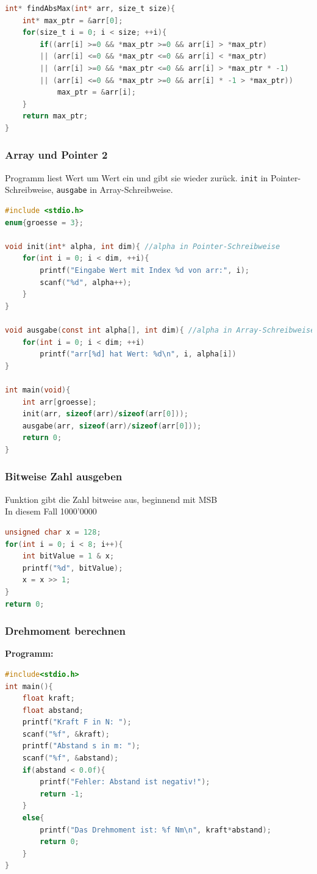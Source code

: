			\begin{lstlisting}[language=C]
int* findAbsMax(int* arr, size_t size){
	int* max_ptr = &arr[0];
	for(size_t i = 0; i < size; ++i){
		if((arr[i] >=0 && *max_ptr >=0 && arr[i] > *max_ptr)
		|| (arr[i] <=0 && *max_ptr <=0 && arr[i] < *max_ptr)
		|| (arr[i] >=0 && *max_ptr <=0 && arr[i] > *max_ptr * -1)
		|| (arr[i] <=0 && *max_ptr >=0 && arr[i] * -1 > *max_ptr))
			max_ptr = &arr[i];
	}
	return max_ptr;
}
			\end{lstlisting}
		
		\subsubsection{Array und Pointer 2}
			Programm liest Wert um Wert ein und gibt sie wieder zurück. \verb|init| in Pointer-Schreibweise, \verb|ausgabe| in Array-Schreibweise.
			\begin{lstlisting}[language=C]
#include <stdio.h>
enum{groesse = 3};

void init(int* alpha, int dim){ //alpha in Pointer-Schreibweise
	for(int i = 0; i < dim, ++i){
		printf("Eingabe Wert mit Index %d von arr:", i);
		scanf("%d", alpha++);
	}
}

void ausgabe(const int alpha[], int dim){ //alpha in Array-Schreibweise
	for(int i = 0; i < dim; ++i)
		printf("arr[%d] hat Wert: %d\n", i, alpha[i])
}

int main(void){
	int arr[groesse];
	init(arr, sizeof(arr)/sizeof(arr[0]));
	ausgabe(arr, sizeof(arr)/sizeof(arr[0]));
	return 0;
}
			\end{lstlisting}

		\subsubsection{Bitweise Zahl ausgeben}
			Funktion gibt die Zahl bitweise aus, beginnend mit MSB\\
			In diesem Fall 1000'0000
			\begin{lstlisting}[language=C]
unsigned char x = 128;
for(int i = 0; i < 8; i++){
	int bitValue = 1 & x;
	printf("%d", bitValue);
	x = x >> 1;
}
return 0;
			\end{lstlisting}

		\subsubsection{Drehmoment berechnen}
			\textbf{Programm:}
			\begin{lstlisting}[language=C]
#include<stdio.h>
int main(){
	float kraft;
	float abstand;
	printf("Kraft F in N: ");
	scanf("%f", &kraft);
	printf("Abstand s in m: ");
	scanf("%f", &abstand);
	if(abstand < 0.0f){
		printf("Fehler: Abstand ist negativ!");
		return -1;
	}
	else{
		printf("Das Drehmoment ist: %f Nm\n", kraft*abstand);
		return 0;
	}
}
			\end{lstlisting}

